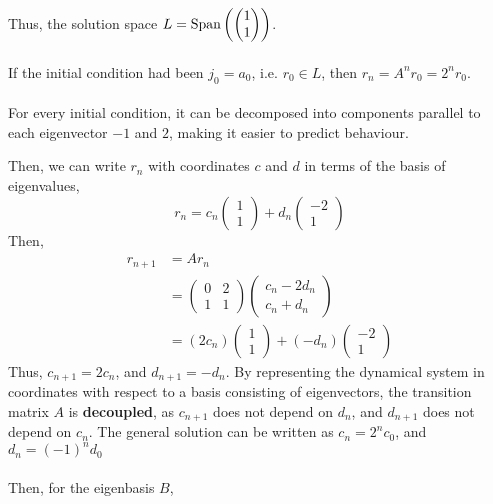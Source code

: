 \documentclass[letterpaper,12pt]{article}
\begin{document}
\\ \\ Thus, the solution space $L = \text{Span}\left(\begin{pmatrix} 1 \\ 1 \end{pmatrix} \right)$.
\\ \\ If the initial condition had been $j_0 = a_0$, i.e. $r_0 \in L$, then $r_n = A^n r_0 = 2^n r_0$.
\\ \\ For every initial condition, it can be decomposed into components parallel to each eigenvector $-1$ and $2$, making it easier to predict behaviour.

Then, we can write $r_n$ with coordinates $c$ and $d$ in terms of the basis of eigenvalues,
\begin{equation*}
    r_n = c_n \begin{pmatrix} 1 \\ 1 \end{pmatrix} + d_n \begin{pmatrix} -2 \\ 1 \end{pmatrix}
\end{equation*}
Then,
\begin{align*}
    r_{n+1} & = Ar_n \\
    & = \begin{pmatrix} 0 & 2 \\ 1 & 1 \end{pmatrix} \begin{pmatrix} c_n - 2d_n \\ c_n + d_n \end{pmatrix} \\
    & = (2c_n) \begin{pmatrix} 1 \\ 1 \end{pmatrix} + (-d_n) \begin{pmatrix} -2 \\ 1 \end{pmatrix}
\end{align*}
Thus, $c_{n+1} = 2c_n$, and $d_{n+1} = -d_n$. By representing the dynamical system in coordinates with respect to a basis consisting of eigenvectors, the transition matrix $A$ is \textbf{decoupled}, as $c_{n+1}$ does not depend on $d_n$, and $d_{n+1}$ does not depend on $c_n$. The general solution can be written as $c_n = 2^n c_0$, and $d_n = (-1)^n d_0$
\\ \\ Then, for the eigenbasis $B$,
\end{document}
